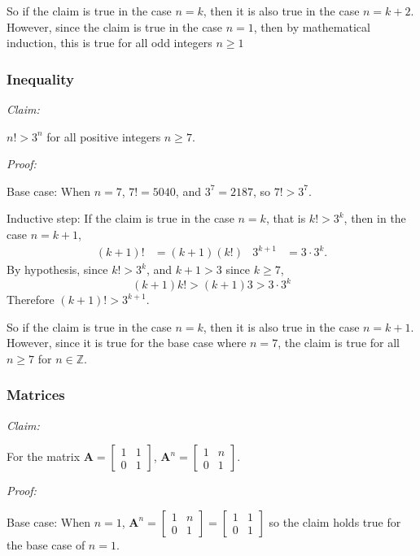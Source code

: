 \documentclass[11pt, a4paper]{article}
\begin{document}
So if the claim is true in the case $n=k$, then it is also true in the case $n=k+2$. However, since the claim is true in the case $n=1$, then by mathematical induction, this is true for all odd integers $n\geq1$

\subsubsection*{Inequality}
\noindent\emph{Claim:} \newline \par
$n!>3^{n}$ for all positive integers $n\geq7$.\newline\par
\noindent\emph{Proof:}\newline\par
Base case: When $n=7$, $7!=5040$, and $3^{7}=2187$, so $7!>3^{7}$. \newline \par

Inductive step: If the claim is true in the case $n=k$, that is $k!>3^{k}$, then in the case $n=k+1$,
\begin{align*}
(k+1)!&=(k+1)(k!) & 3^{k+1}&=3\cdot3^{k}.
\end{align*}
By hypothesis, since $k!>3^{k}$, and $k+1>3$ since $k\geq7$,
\begin{equation*}
(k+1)k!>(k+1)3>3\cdot3^{k}
\end{equation*}
Therefore $(k+1)!>3^{k+1}$. \newline \par

So if the claim is true in the case $n=k$, then it is also true in the case $n=k+1$. However, since it is true for the base case where $n=7$, the claim is true for all $n\geq7$ for $n\in\mathbb{Z}$.

\subsubsection*{Matrices}
\noindent\emph{Claim:} \newline \par
For the matrix $\boldsymbol{A}=\begin{bmatrix}1&1\\0&1\end{bmatrix}$, $\boldsymbol{A}^{n}=\begin{bmatrix}1&n\\0&1\end{bmatrix}$.\newline\par
\noindent\emph{Proof:}\newline\par
Base case: When $n=1$, $\boldsymbol{A}^{n}=\begin{bmatrix}1&n\\0&1\end{bmatrix}=\begin{bmatrix}1&1\\0&1\end{bmatrix}$ so the claim holds true for the base case of $n=1$. \newline \par
\end{document}
